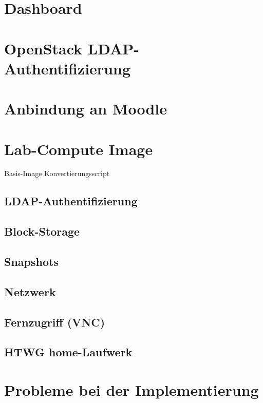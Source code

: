 \section{Dashboard}

\section{OpenStack LDAP-Authentifizierung}

\section{Anbindung an Moodle}

\section{Lab-Compute Image}

Basis-Image
Konvertierungsscript

\subsection{LDAP-Authentifizierung}

\subsection{Block-Storage}

\subsection{Snapshots}

\subsection{Netzwerk}

\subsection{Fernzugriff (VNC)}

\subsection{HTWG home-Laufwerk}


\section{Probleme bei der Implementierung}

